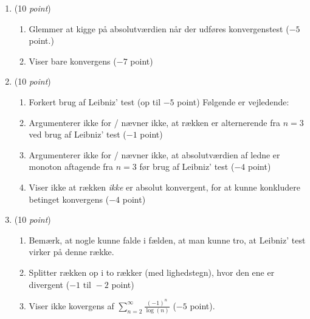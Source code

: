 \documentclass{article}
\begin{document}
\begin{opg}\hfill
	\begin{enumerate}
		\item (10 \emph{point})\begin{enumerate}[label=(\roman*)]
			\item Glemmer at kigge på absolutværdien når der udføres konvergenstest ($ -5 $ point.)
			\item Viser bare konvergens ($ -7 $ point)
		\end{enumerate}
		\item (10 \emph{point}) \begin{enumerate}[label=(\roman*)]
			\item Forkert brug af Leibniz' test (op til $ -5 $ point) Følgende er vejledende:
			\item Argumenterer ikke for / nævner ikke, at rækken er alternerende fra $ n=3 $ ved brug af Leibniz' test ($ -1 $ point)
			\item Argumenterer ikke for / nævner ikke, at absolutværdien af ledne er monoton aftagende fra $ n=3 $ før brug af Leibniz' test ($ -4 $ point)
			\item Viser ikke at rækken \emph{ikke} er absolut konvergent, for at kunne konkludere betinget konvergens ($ -4 $ point)
		\end{enumerate}
		\item (10 \emph{point})\begin{enumerate}[label=(\roman*)]
			\item Bemærk, at nogle kunne falde i fælden, at man kunne tro, at Leibniz' test virker på denne række.
			\item Splitter rækken op i to rækker (med lighedstegn), hvor den ene er divergent ($ -1\text{ til }-2 $ point)
			\item Viser ikke kovergens af $ \sum_{n=2}^{\infty}\frac{(-1)^n}{\log(n)} $ ($ -5 $ point).
		\end{enumerate}
	\end{enumerate}	
\end{opg}
\end{document}
